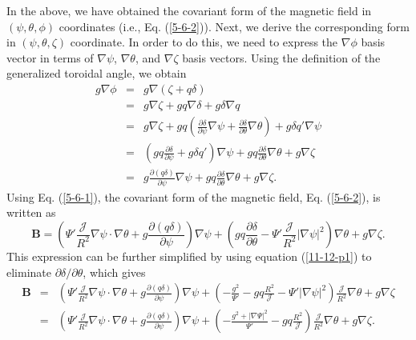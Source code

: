\documentclass{llncs}
\begin{document}
In the above, we have obtained the covariant form of the magnetic field in
$(\psi, \theta, \phi)$ coordinates (i.e., Eq. (\ref{5-6-2})). Next, we derive
the corresponding form in $(\psi, \theta, \zeta)$ coordinate. In order to do
this, we need to express the $\nabla \phi$ basis vector in terms of $\nabla
\psi$, $\nabla \theta$, and $\nabla \zeta$ basis vectors. Using the definition
of the generalized toroidal angle, we obtain
\begin{eqnarray}
  g \nabla \phi & = & g \nabla (\zeta + q \delta) \nonumber\\
  & = & g \nabla \zeta + g q \nabla \delta + g \delta \nabla q \nonumber\\
  & = & g \nabla \zeta + g q \left( \frac{\partial \delta}{\partial \psi}
  \nabla \psi + \frac{\partial \delta}{\partial \theta} \nabla \theta \right)
  + g \delta q' \nabla \psi \nonumber\\
  & = & \left( g q \frac{\partial \delta}{\partial \psi} + g \delta q'
  \right) \nabla \psi + g q \frac{\partial \delta}{\partial \theta} \nabla
  \theta + g \nabla \zeta \nonumber\\
  & = & g \frac{\partial (q \delta)}{\partial \psi} \nabla \psi + g q
  \frac{\partial \delta}{\partial \theta} \nabla \theta + g \nabla \zeta . 
  \label{5-6-1}
\end{eqnarray}
Using Eq. (\ref{5-6-1}), the covariant form of the magnetic field, Eq.
(\ref{5-6-2}), is written as
\begin{equation}
  \label{5-9-a1} \mathbf{B}= \left( \Psi' \frac{\mathcal{J}}{R^2} \nabla \psi
  \cdot \nabla \theta + g \frac{\partial (q \delta)}{\partial \psi} \right)
  \nabla \psi + \left( g q \frac{\partial \delta}{\partial \theta} - \Psi'
  \frac{\mathcal{J}}{R^2} | \nabla \psi |^2 \right) \nabla \theta + g \nabla
  \zeta .
\end{equation}
This expression can be further simplified by using equation (\ref{11-12-p1})
to eliminate $\partial \delta / \partial \theta$, which gives
\begin{eqnarray}
  \mathbf{B} & = & \left( \Psi' \frac{\mathcal{J}}{R^2} \nabla \psi \cdot
  \nabla \theta + g \frac{\partial (q \delta)}{\partial \psi} \right) \nabla
  \psi + \left( - \frac{g^2}{\Psi'} - g q \frac{R^2}{\mathcal{J}} - \Psi' |
  \nabla \psi |^2 \right) \frac{\mathcal{J}}{R^2} \nabla \theta + g \nabla
  \zeta \nonumber\\
  & = & \left( \Psi' \frac{\mathcal{J}}{R^2} \nabla \psi \cdot \nabla \theta
  + g \frac{\partial (q \delta)}{\partial \psi} \right) \nabla \psi + \left( -
  \frac{g^2 + | \nabla \Psi |^2}{\Psi'} - g q \frac{R^2}{\mathcal{J}} \right)
  \frac{\mathcal{J}}{R^2} \nabla \theta + g \nabla \zeta . 
\end{eqnarray}
\end{document}
